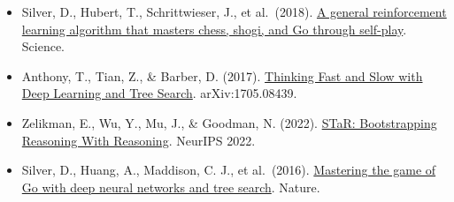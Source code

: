 \vspace{0.25em}
\begin{itemize}
\tightlist
\item
  Silver, D., Hubert, T., Schrittwieser, J., et al.~(2018). \href{https://www.science.org/doi/10.1126/science.aar6404}{A general reinforcement learning algorithm that masters chess, shogi, and Go through self-play}. Science.
\item
  Anthony, T., Tian, Z., \& Barber, D. (2017). \href{https://arxiv.org/abs/1705.08439}{Thinking Fast and Slow with Deep Learning and Tree Search}. arXiv:1705.08439.
\item
  Zelikman, E., Wu, Y., Mu, J., \& Goodman, N. (2022). \href{https://arxiv.org/abs/2203.14465}{STaR: Bootstrapping Reasoning With Reasoning}. NeurIPS 2022.
\item
  Silver, D., Huang, A., Maddison, C. J., et al.~(2016). \href{https://www.nature.com/articles/nature16961}{Mastering the game of Go with deep neural networks and tree search}. Nature.
\end{itemize}

\clearpage
